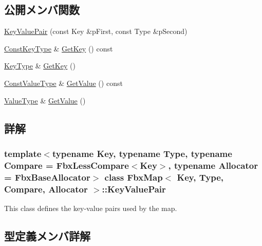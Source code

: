 \subsection*{公開メンバ関数}
\begin{DoxyCompactItemize}
\item 
\hyperlink{class_fbx_map_1_1_key_value_pair_ad6f068ce05b4e108a0218ffaa45c0994}{Key\+Value\+Pair} (const Key \&p\+First, const Type \&p\+Second)
\item 
\hyperlink{class_fbx_map_1_1_key_value_pair_a74738485dc0b74e76e09dfbcdca9e62e}{Const\+Key\+Type} \& \hyperlink{class_fbx_map_1_1_key_value_pair_a6e43d1f01dc25d31294138c4c60b3b11}{Get\+Key} () const
\item 
\hyperlink{class_fbx_map_1_1_key_value_pair_a5e685c6ff77cdf31f878e5105737c1a3}{Key\+Type} \& \hyperlink{class_fbx_map_1_1_key_value_pair_a68e18fe165bce40f21e0e18eef92978c}{Get\+Key} ()
\item 
\hyperlink{class_fbx_map_1_1_key_value_pair_a13d0030dcec9979f30273cc4ac6ed871}{Const\+Value\+Type} \& \hyperlink{class_fbx_map_1_1_key_value_pair_a42766d8323b96bc993df3f582ff35313}{Get\+Value} () const
\item 
\hyperlink{class_fbx_map_1_1_key_value_pair_a716c83c1f6dabf173132b5acde84a9fe}{Value\+Type} \& \hyperlink{class_fbx_map_1_1_key_value_pair_ab06a5a6b1f2d03ae14a98a91cdfac643}{Get\+Value} ()
\end{DoxyCompactItemize}


\subsection{詳解}
\subsubsection*{template$<$typename Key, typename Type, typename Compare = Fbx\+Less\+Compare$<$\+Key$>$, typename Allocator = Fbx\+Base\+Allocator$>$\newline
class Fbx\+Map$<$ Key, Type, Compare, Allocator $>$\+::\+Key\+Value\+Pair}

This class defines the key-\/value pairs used by the map. 

\subsection{型定義メンバ詳解}
\mbox{\label{class_fbx_map_1_1_key_value_pair_a74738485dc0b74e76e09dfbcdca9e62e}} 
